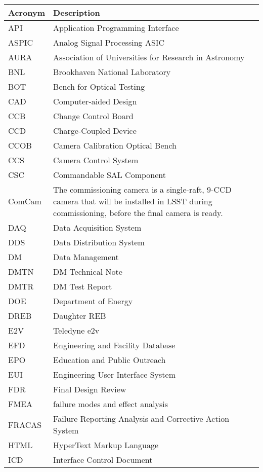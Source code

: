 \addtocounter{table}{-1}
\begin{longtable}{p{}p{}}\hline
\textbf{Acronym} & \textbf{Description}  \\\hline

API & Application Programming Interface \\\hline
ASPIC & Analog Signal Processing ASIC \\\hline
AURA & Association of Universities for Research in Astronomy \\\hline
BNL & Brookhaven National Laboratory \\\hline
BOT & Bench for Optical Testing \\\hline
CAD & Computer-aided Design \\\hline
CCB & Change Control Board \\\hline
CCD & Charge-Coupled Device \\\hline
CCOB & Camera Calibration Optical Bench \\\hline
CCS & Camera Control System \\\hline
CSC & Commandable SAL Component \\\hline
ComCam & The commissioning camera is a single-raft, 9-CCD camera that will be installed in LSST during commissioning, before the final camera is ready. \\\hline
DAQ & Data Acquisition System \\\hline
DDS & Data Distribution System \\\hline
DM & Data Management \\\hline
DMTN & DM Technical Note \\\hline
DMTR & DM Test Report \\\hline
DOE & Department of Energy \\\hline
DREB & Daughter REB \\\hline
E2V & Teledyne e2v \\\hline
EFD & Engineering and Facility Database \\\hline
EPO & Education and Public Outreach \\\hline
EUI & Engineering User Interface System \\\hline
FDR & Final Design Review \\\hline
FMEA & failure modes and effect analysis \\\hline
FRACAS & Failure Reporting Analysis and Corrective Action System \\\hline
HTML & HyperText Markup Language \\\hline
ICD & Interface Control Document \\\hline

\end{longtable}
